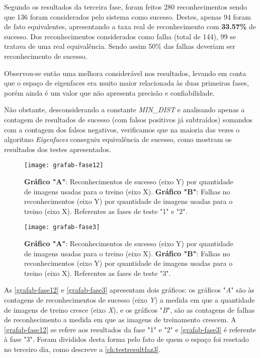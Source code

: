 Segundo os resultados da terceira fase, foram feitos 280 reconhecimentos sendo que 136 foram considerados pelo sistema como sucesso. Destes, apenas 94 foram de fato equivalentes, apresentando a taxa real de reconhecimento com \textbf{33.57\%} de sucesso. Dos reconhecimentos considerados como falha (total de 144), 99 se tratava de uma real equivalência. Sendo assim 50\% das falhas deveriam ser reconhecimento de sucesso.

Observou-se então uma melhora considerável nos resultados, levando em conta que o espaço de eigenfaces era muito maior relacionada às duas primeiras fases, porém ainda é um valor que não apresenta precisão e confiabilidade. 

Não obstante, desconsiderando a constante \textit{MIN\_DIST} e analisando apenas a contagem de resultados de sucesso (com falsos positivos já subtraídos) somandos com a contagem dos falsos negativos, verificamos que na maioria das vezes o algoritmo \textit{Eigenfaces} conseguiu equivalência de sucesso, como mostram os resultados dos testes apresentados.


\begin{figure}[h]
	\centering
	\texttt{[image: grafab-fase12]}
	\caption{\textbf{Gráfico "A"}: Reconhecimentos de sucesso (eixo Y) por quantidade de imagens usadas para o treino (eixo X). \textbf{Gráfico "B"}: Falhas no reconhecimentos (eixo Y) por quantidade de imagens usadas para o treino (eixo X). Referentes as fases de teste "1" e "2".}
	\label{grafab-fase12}
\end{figure}

\begin{figure}[h]
	\centering
	\texttt{[image: grafab-fase3]}
	\caption{\textbf{Gráfico "A"}: Reconhecimentos de sucesso (eixo Y) por quantidade de imagens usadas para o treino (eixo X). \textbf{Gráfico "B"}: Falhas no reconhecimentos (eixo Y) por quantidade de imagens usadas para o treino (eixo X). Referentes as fases de teste "3".}
	\label{grafab-fase3}
\end{figure}


As \autoref{grafab-fase12} e \autoref{grafab-fase3} apresentam dois gráficos: os gráficos "\textit{A}" são às contagens de reconhecimentos de sucesso (eixo \textit{Y}) a medida em que a quantidade de imagens de treino cresce (eixo \textit{X}), e os gráficos "\textit{B}", são as contagens de falhas de reconhecimento a medida em que as imagens de treinamento crescem. A \autoref{grafab-fase12} se refere aos resultados da fase "1" e "2" e \autoref{grafab-fase3} é referente à fase "3". Foram divididos desta forma pelo fato de quem o espaço foi resetado no terceiro dia, como descreve a \autoref{ch:testresultfaz3}. 

